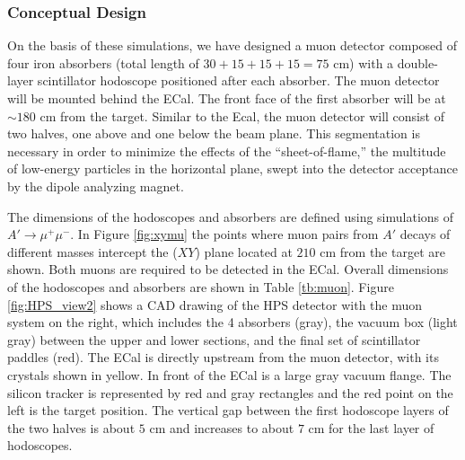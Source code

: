 \subsubsection{Conceptual Design}

On the basis of these simulations, we have designed a muon detector composed of four iron absorbers (total length of $30+15+15+15=75$ cm) 
with a double-layer scintillator hodoscope positioned after each absorber. The muon detector will be mounted behind the ECal.  The front face 
of the first absorber will be at $\sim 180$ cm from the target. Similar to the Ecal, the muon detector will consist of two halves, one above 
and one below the beam plane.  This segmentation is necessary in order to
minimize the effects of the ``sheet-of-flame,'' the multitude of low-energy particles in the horizontal plane, swept into the detector 
acceptance by the dipole analyzing magnet.

The dimensions of the hodoscopes and absorbers are defined using simulations of $A'\to \mu^+\mu^-$. In 
Figure \ref{fig:xymu} the points where muon pairs from $A'$ decays of different masses intercept the ($XY$) plane located at $210$ cm from the 
target are shown. Both muons are required to be detected in the ECal. Overall dimensions of the hodoscopes and absorbers are shown in 
Table \ref{tb:muon}.  
Figure \ref{fig:HPS_view2} shows a CAD
drawing of the HPS detector with the muon system on the right, which includes the 4 absorbers (gray), the vacuum box (light gray) 
between the upper and lower sections, and the final set of scintillator paddles (red). The ECal is directly upstream from the muon detector, 
with its crystals shown in yellow.  In front of the ECal is a large gray vacuum flange.  The silicon tracker is represented by red and gray 
rectangles and  the red point on the left is the target position. The vertical gap between the first hodoscope layers of the two halves is 
about $5$ cm and increases to about $7$ cm for the last layer of hodoscopes. 

